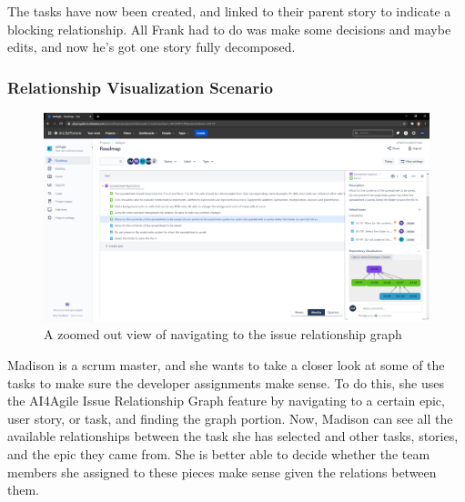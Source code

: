 The tasks have now been created, and linked to their parent story to indicate a blocking relationship. All Frank had to do was make some decisions and maybe edits, and now he’s got one story fully decomposed.

\subsubsection{Relationship Visualization Scenario}

\begin{figure}
\centerline{\includegraphics[width=\textwidth,height=\textheight,keepaspectratio]{./figure/Scenario2Figure1.png}}
\caption{A zoomed out view of navigating to the issue relationship graph}
\end{figure}

Madison is a scrum master, and she wants to take a closer look at some of the tasks to make sure the developer assignments make sense. To do this, she uses the AI4Agile Issue Relationship Graph feature by navigating to a certain epic, user story, or task, and finding the graph portion. Now, Madison can see all the available relationships between the task she has selected and other tasks, stories, and the epic they came from. She is better able to decide whether the team members she assigned to these pieces make sense given the relations between them.

